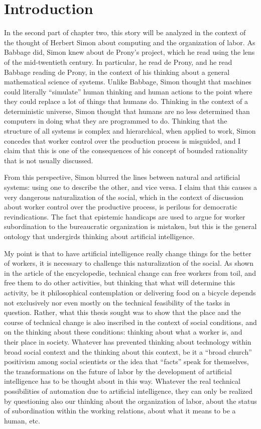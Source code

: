 \documentclass[version=last,draft=false,paper=A4,portrait,twoside=true,twocolumn=false,headinclude=false,footinclude=false,mpinclude=true,fontsize=12,BCOR=20mm,DIV=calc,pagesize=auto,open=right,chapterprefix=true,numbers=autoendperiod,headsepline=false,headings=twolinechapter,parskip=false]{scrbook}
\author{Carlos Alberto Rivera Carreño}
\date{}
\title{}
\begin{document}
\chapter{Introduction}
\label{sec:orgc1f5482}
In the second part of chapter two, this story will be analyzed in the
context of the thought of Herbert Simon about computing and the
organization of labor. As Babbage did, Simon knew about de Prony's project,
which he read using the lens of the mid-twentieth century. In particular,
he read de Prony, and he read Babbage reading de Prony, in the context of
his thinking about a general mathematical science of systems. Unlike
Babbage, Simon thought that machines could literally ``simulate'' human
thinking and human actions to the point where they could replace a lot of
things that humans do. Thinking in the context of a deterministic universe,
Simon thought that humans are no less determined than computers in doing
what they are programmed to do. Thinking that the structure of all systems
is complex and hierarchical, when applied to work, Simon concedes that
worker control over the production process is misguided, and I claim that
this is one of the consequences of his concept of bounded rationality that
is not usually discussed. 

From this perspective, Simon blurred the lines between natural and
artificial systems: using one to describe the other, and vice versa. I
claim that this causes a very dangerous naturalization of the social, which
in the context of discussion about worker control over the productive
process, is perilous for democratic revindications. The fact that epistemic
handicaps are used to argue for worker subordination to the bureaucratic
organization is mistaken, but this is the general ontology that undergirds
thinking about artificial intelligence. 

My point is that to have artificial intelligence really change things for
the better of workers, it is necessary to challenge this naturalization of
the social. As shown in the article of the encyclopedie, technical change
can free workers from toil, and free them to do other activities, but
thinking that what will determine this activity, be it philosophical
contemplation or delivering food on a bicycle depends not exclusively nor
even mostly on the technical feasibility of the tasks in question. Rather,
what this thesis sought was to show that the place and the course of
technical change is also inscribed in the context of social conditions, and
on the thinking about these conditions: thinking about what a worker is,
and their place in society. Whatever has prevented thinking about
technology within broad social context and the thinking about this context,
be it a ``broad church'' positivism among social scientists or the idea
that ``facts'' speak for themselves, the transformations on the future of
labor by the development of artificial intelligence has to be thought about
in this way. Whatever the real technical possibilities of automation due to
artificial intelligence, they can only be realized by questioning also our
thinking about the organization of labor, about the status of subordination
within the working relations, about what it means to be a human, etc.
\end{document}
